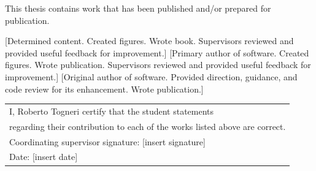 \documentclass{book}
\begin{document}
\begin{flushleft}
	This thesis contains work that has been published and/or prepared for publication.

	[Determined content. Created figures. Wrote book. Supervisors reviewed and provided useful feedback for improvement.]
	[Primary author of software. Created figures. Wrote publication. Supervisors reviewed and provided useful feedback for improvement.]
	[Original author of software. Provided direction, guidance, and code review for its enhancement. Wrote publication.]
	
	\vfill
	\vskip 0.5cm
	\begin{tabular}{l}
		I, Roberto Togneri certify that the student statements \\ regarding their contribution to each of the works listed above are correct. \\
		Coordinating supervisor signature: {[insert signature]}\\
		Date: {[insert date]}
	\end{tabular}
	\vspace{3cm}
\end{flushleft}
\end{document}

